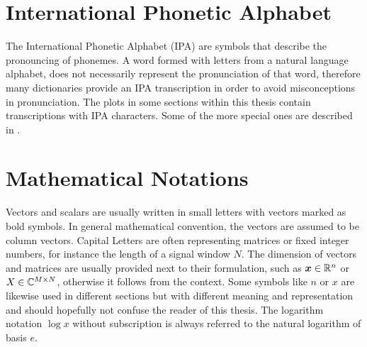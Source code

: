 
\section{International Phonetic Alphabet}\label{sec:appendix_ipa}
The International Phonetic Alphabet (IPA) are symbols that describe the pronouncing of phonemes.
A word formed with letters from a natural language alphabet, does not necessarily represent the pronunciation of that word, therefore many dictionaries provide an IPA transcription in order to avoid misconceptions in pronunciation.
The plots in some sections within this thesis contain transcriptions with IPA characters.
Some of the more special ones are described in .




\section{Mathematical Notations}\label{sec:appendix_math}
Vectors and scalars are usually written in small letters with vectors marked as bold symbols.
In general mathematical convention, the vectors are assumed to be column vectors.
Capital Letters are often representing matrices or fixed integer numbers, for instance the length of a signal window $N$.
The dimension of vectors and matrices are usually provided next to their formulation, such as $\bm{x} \in \mathbb{R}^n$ or $X \in \mathbb{C}^{M \times N}$, otherwise it follows from the context.
Some symbols like $n$ or $x$ are likewise used in different sections but with different meaning and representation and should hopefully not confuse the reader of this thesis.
The logarithm notation $\log x$ without subscription is always referred to the natural logarithm of basis $e$.